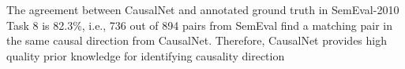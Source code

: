 The agreement between CausalNet and annotated ground truth in SemEval-2010
Task 8 is 82.3\%, i.e., 736 out of 894 pairs from SemEval find 
a matching pair in the same causal direction from CausalNet.
Therefore, CausalNet provides high quality prior knowledge for
identifying causality direction 
